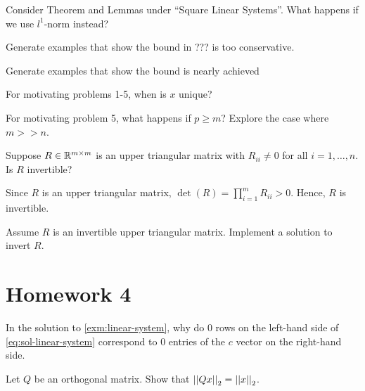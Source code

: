 \documentclass[]{book}
\theoremstyle{definition}
\theoremstyle{definition}
\theoremstyle{definition}
\theoremstyle{remark}
\let\BeginKnitrBlock\begin \let\EndKnitrBlock\end
\begin{document}
\BeginKnitrBlock{exercise}
\protect\hypertarget{exr:q302}{}{\label{exr:q302} }Consider Theorem and
Lemmas under ``Square Linear Systems''. What happens if we use
\(l^{1}\)-norm instead?
\EndKnitrBlock{exercise}

\BeginKnitrBlock{exercise}
\protect\hypertarget{exr:q303}{}{\label{exr:q303} }Generate examples that
show the bound in ??? is too conservative.
\EndKnitrBlock{exercise}

\BeginKnitrBlock{exercise}
\protect\hypertarget{exr:q304}{}{\label{exr:q304} }Generate examples that
show the bound is nearly achieved
\EndKnitrBlock{exercise}

\BeginKnitrBlock{exercise}
\protect\hypertarget{exr:q305}{}{\label{exr:q305} }For motivating problems
1-5, when is \(x\) unique?
\EndKnitrBlock{exercise}

\BeginKnitrBlock{exercise}
\protect\hypertarget{exr:q306}{}{\label{exr:q306} }For motivating problem 5,
what happens if \(p\geq m\)? Explore the case where \(m >> n\).
\EndKnitrBlock{exercise}

\BeginKnitrBlock{exercise}
\protect\hypertarget{exr:q307}{}{\label{exr:q307} }Suppose
\(R \in \mathbb{R}^{m\times m}\) is an upper triangular matrix with
\(R_{ii} \neq 0\) for all \(i = 1,\ldots, n\). Is \(R\) invertible?
\EndKnitrBlock{exercise}

\BeginKnitrBlock{solution}
\iffalse{} {Solution. } \fi{}Since \(R\) is an upper triangular matrix,
\(\det(R) = \prod_{i=1}^{m} R_{ii} > 0\). Hence, \(R\) is invertible.
\EndKnitrBlock{solution}

\BeginKnitrBlock{exercise}
\protect\hypertarget{exr:q308}{}{\label{exr:q308} }Assume \(R\) is an
invertible upper triangular matrix. Implement a solution to invert
\(R\).
\EndKnitrBlock{exercise}

\section{Homework 4}\label{homework-4}

\BeginKnitrBlock{exercise}
\protect\hypertarget{exr:q401}{}{\label{exr:q401} }In the solution to
\ref{exm:linear-system}, why do \(0\) rows on the left-hand side of
\eqref{eq:sol-linear-system} correspond to \(0\) entries of the \(c\)
vector on the right-hand side.
\EndKnitrBlock{exercise}

\BeginKnitrBlock{exercise}
\protect\hypertarget{exr:q402}{}{\label{exr:q402} }Let \(Q\) be an
orthogonal matrix. Show that \(\left \vert \left \vert Qx \right \vert \right \vert_2 = \left \vert \left \vert x \right \vert \right \vert_2\).
\EndKnitrBlock{exercise}
\end{document}
